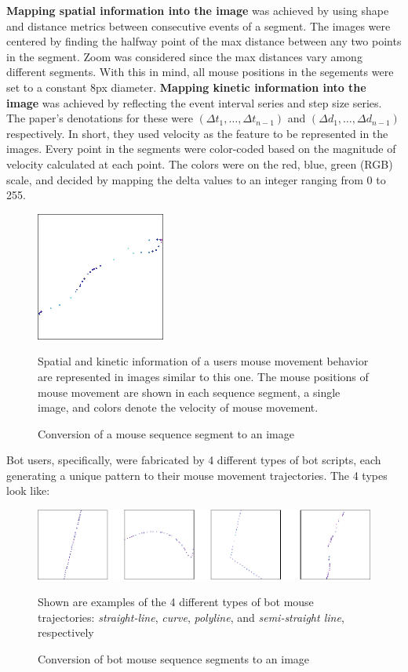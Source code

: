 \textbf{Mapping spatial information into the image} was achieved by using shape and distance metrics between consecutive events of a segment.
The images were centered by finding the halfway point of the max distance between any two points in the segment.
Zoom was considered since the max distances vary among different segments.
With this in mind, all mouse positions in the segements were set to a constant 8px diameter.
\textbf{Mapping kinetic information into the image} was achieved by reflecting the event interval series and step size series.
The paper's denotations for these were $({\Delta}t_1,\dots,{\Delta}t_{n-1})$ and $({\Delta}d_1,\dots,{\Delta}d_{n-1})$ respectively.
In short, they used velocity as the feature to be represented in the images.
Every point in the segments were color-coded based on the magnitude of velocity calculated at each point.
The colors were on the red, blue, green (RGB) scale, and decided by mapping the delta values to an integer ranging from 0 to 255.
\begin{figure}[!h]
    \centering
    \includegraphics[width=.35\columnwidth]{figures/deep_learning_with_mouse_dynamics_mouse_segment_image_generation}
    \caption{Conversion of a mouse sequence segment to an image}
    \label{fig:deep-learning-image-generation}
    {\small Spatial and kinetic information of a users mouse movement behavior are represented in images similar to this one. The mouse positions of mouse movement are shown in each sequence segment, a single image, and colors denote the velocity of mouse movement.}
\end{figure}
Bot users, specifically, were fabricated by 4 different types of bot scripts, each generating a unique pattern to their mouse movement trajectories.
The 4 types look like:
\begin{figure}[!h]
    \centering
    \includegraphics[width=1\columnwidth]{figures/deep_learning_with_mouse_dynamics_mouse_segment_image_generation_bots}
    \caption{Conversion of bot mouse sequence segments to an image}
    \label{fig:deep-learning-image-generation-bots}
    {\small Shown are examples of the 4 different types of bot mouse trajectories: \textit{straight-line}, \textit{curve}, \textit{polyline}, and \textit{semi-straight line}, respectively}
\end{figure}
